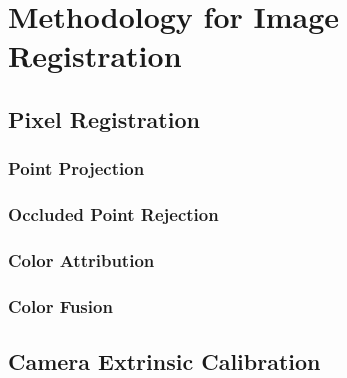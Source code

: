 \chapter{Methodology for Image Registration}
\label{section:methodology-for-image-registration}

\section{Pixel Registration}
\label{section:pixel-registration}

\subsection{Point Projection}
\label{section:point-projection}

\subsection{Occluded Point Rejection}
\label{section:occluded-point-rejection}

\subsection{Color Attribution}
\label{section:color-attribution}

\subsection{Color Fusion}
\label{section:color-fusion}



\section{Camera Extrinsic Calibration}
\label{section:camera-extrinsic-calibration}
